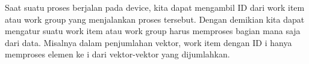 Saat suatu proses berjalan pada device, kita dapat mengambil ID dari work item atau work group yang menjalankan proses tersebut. Dengan demikian kita dapat mengatur suatu work item atau work group harus memproses bagian mana saja dari data. Misalnya dalam penjumlahan vektor, work item dengan ID i hanya memproses elemen ke i dari vektor-vektor yang dijumlahkan.